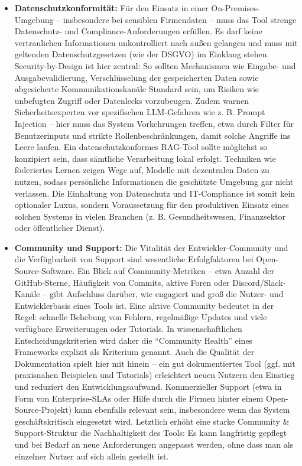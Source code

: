 \begin{itemize}
    \item \textbf{Datenschutzkonformität:} Für den Einsatz in einer On-Premises-Umgebung – insbesondere bei sensiblen Firmendaten – muss das Tool strenge Datenschutz- und Compliance-Anforderungen erfüllen. Es darf keine vertraulichen Informationen unkontrolliert nach außen gelangen und muss mit geltenden Datenschutzgesetzen (wie der DSGVO) im Einklang stehen. Security-by-Design ist hier zentral: So sollten Mechanismen wie Eingabe- und Ausgabevalidierung, Verschlüsselung der gespeicherten Daten sowie abgesicherte Kommunikationskanäle Standard sein, um Risiken wie unbefugten Zugriff oder Datenlecks vorzubeugen. Zudem warnen Sicherheitsexperten vor spezifischen LLM-Gefahren wie z. B. Prompt Injection – hier muss das System Vorkehrungen treffen, etwa durch Filter für Benutzerinputs und strikte Rollenbeschränkungen, damit solche Angriffe ins Leere laufen. Ein datenschutzkonformes RAG-Tool sollte möglichst so konzipiert sein, dass sämtliche Verarbeitung lokal erfolgt. Techniken wie föderiertes Lernen zeigen Wege auf, Modelle mit dezentralen Daten zu nutzen, sodass persönliche Informationen die geschützte Umgebung gar nicht verlassen. Die Einhaltung von Datenschutz und IT-Compliance ist somit kein optionaler Luxus, sondern Voraussetzung für den produktiven Einsatz eines solchen Systems in vielen Branchen (z. B. Gesundheitswesen, Finanzsektor oder öffentlicher Dienst).
    \item \textbf{Community und Support:} Die Vitalität der Entwickler-Community und die Verfügbarkeit von Support sind wesentliche Erfolgfaktoren bei Open-Source-Software. Ein Blick auf Community-Metriken – etwa Anzahl der GitHub-Sterne, Häufigkeit von Commits, aktive Foren oder Discord/Slack-Kanäle – gibt Aufschluss darüber, wie engagiert und groß die Nutzer- und Entwicklerbasis eines Tools ist. Eine aktive Community bedeutet in der Regel: schnelle Behebung von Fehlern, regelmäßige Updates und viele verfügbare Erweiterungen oder Tutorials. In wissenschaftlichen Entscheidungskriterien wird daher die “Community Health” eines Frameworks explizit als Kriterium genannt. Auch die Qualität der Dokumentation spielt hier mit hinein – ein gut dokumentiertes Tool (ggf. mit praxisnahen Beispielen und Tutorials) erleichtert neuen Nutzern den Einstieg und reduziert den Entwicklungsaufwand. Kommerzieller Support (etwa in Form von Enterprise-SLAs oder Hilfe durch die Firmen hinter einem Open-Source-Projekt) kann ebenfalls relevant sein, insbesondere wenn das System geschäftskritisch eingesetzt wird. Letztlich erhöht eine starke Community \& Support-Struktur die Nachhaltigkeit des Tools: Es kann langfristig gepflegt und bei Bedarf an neue Anforderungen angepasst werden, ohne dass man als einzelner Nutzer auf sich allein gestellt ist.

\end{itemize}

